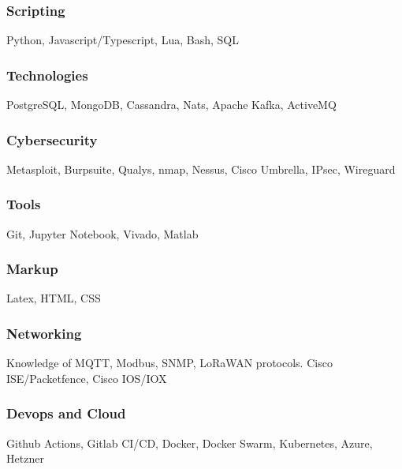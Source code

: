 \documentclass[11pt,a4paper]{article}
\begin{document}
  \subsubsection{Scripting}
  Python, Javascript/Typescript, Lua, Bash, SQL

  \subsubsection{Technologies}
  PostgreSQL, MongoDB, Cassandra, Nats, Apache Kafka, ActiveMQ
  
  \subsubsection{Cybersecurity}
  Metasploit, Burpsuite, Qualys, nmap, Nessus, Cisco Umbrella, IPsec, Wireguard

  \subsubsection{Tools}
  Git, Jupyter Notebook, Vivado, Matlab 

  \subsubsection{Markup}
  Latex, HTML, CSS

  \subsubsection{Networking}
  Knowledge of MQTT, Modbus, SNMP, LoRaWAN protocols. Cisco ISE/Packetfence, Cisco IOS/IOX

  \subsubsection{Devops and Cloud}
  Github Actions, Gitlab CI/CD, Docker, Docker Swarm, Kubernetes, Azure, Hetzner

\end{document}
